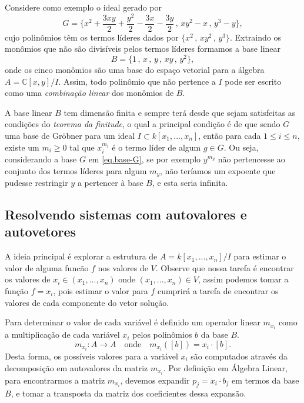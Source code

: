 Considere como exemplo o ideal gerado por 
\begin{equation}\label{eq.base-G}
G=\{x^2+\frac{3xy}{2}+\frac{y^2}{2}-\frac{3x}{2}-\frac{3y}{2}\,,\,xy^2-x\,,\,y^3-y\},
\end{equation}
cujo polinômios têm os termos líderes dados por $\{x^2\,,\,xy^2\,,\,y^3\}$. Extraindo os monômios que não são divisíveis pelos termos líderes formamos a base linear
\begin{equation*}
B=\{1\,,\,x\,,\,y\,,\,xy\,,\,y^2\},
\end{equation*}
onde os cinco monômios são uma base do espaço vetorial para a álgebra $A={\mathbb C}[x,y]/I$. Assim, todo polinômio que não pertence a $I$ pode ser escrito como uma {\it combinação linear} dos monômios de $B$.

A base linear $B$ tem dimensão finita e sempre terá desde que sejam satisfeitas as condições do {\it teorema da finitude}, o qual a principal condição é de que sendo $G$ uma base de Gr\"obner para um ideal $I \subset k[x_1,...,x_n]$, então para cada $1\le i\le n$, existe um $m_i\ge 0$ tal que $x_i^{m_i}$ é o termo líder de algum $g\in G$. Ou seja, considerando a base $G$ em \ref{eq.base-G}, se por exemplo $y^{m_y}$ não pertencesse ao conjunto dos termos líderes para algum $m_y$, não teríamos um expoente que pudesse restringir $y$ a pertencer à base $B$, e esta seria infinita.

\subsection*{Resolvendo sistemas com autovalores e autovetores}

A ideia principal é explorar a estrutura de $A=k[x_1,...,x_n]/I$ para estimar o valor de alguma funcão $f$ nos valores de $V$. Observe que nossa tarefa é encontrar os valores de $x_i\in (x_1,...,x_n)$ onde $(x_1,...,x_n)\in V$, assim podemos tomar a função $f=x_i$, pois estimar o valor para $f$ cumprirá a tarefa de encontrar os valores de cada componente do vetor solução.

Para determinar o valor de cada variável é definido um operador linear $m_{x_i}$ como a multiplicação de cada variável $x_i$ pelos polinômios $b$ da base $B$.
\begin{equation*}
m_{x_i}:A\rightarrow A\quad\text{onde}\quad m_{x_i}([b])=x_i\cdot[b].
\end{equation*} 
Desta forma, os possíveis valores para a variável $x_i$ são computados através da decomposição em autovalores da matriz $m_{x_i}$. Por definição em Álgebra Linear, para encontrarmos a matriz $m_{x_i}$,  devemos expandir $p_j=x_i\cdot b_j$ em termos da base $B$, e tomar a transposta da matriz dos coeficientes dessa expansão.


